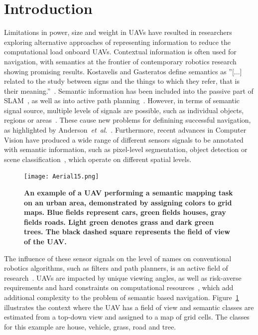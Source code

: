 \documentclass[twocolumn,letterpaper]{IEEEAerospaceCLS}  %
\newcommand{\abbreviation}[1]{\emph{#1}.}
\newcommand{\etal}{\abbreviation{et~al}}
\begin{document}
\section{Introduction} \label{sec:Intro}
Limitations in power, size and weight in UAVs have resulted in researchers exploring alternative approaches of representing information to reduce the computational load onboard UAVs. Contextual information is often used for navigation, with semantics at the frontier of contemporary robotics research showing promising results. Kostavelis and Gasteratos define semantics as ''[...] related to the study between signs and the things to which they refer, that is their meaning.''~\cite{kostavelis_semantic_2015}. Semantic information has been included into the passive part of SLAM~\cite{cadena_past_2016,zhang_hierarchical_2019}, as well as into active path planning~\cite{koch_automatic_2019,alirezaie_exploiting_2017}.  However, in terms of semantic signal source, multiple levels of signals are possible, such as individual objects, regions or areas~\cite{kostavelis_semantic_2015}. These cause new problems for definining successful navigation, as highlighted by Anderson~\etal~\cite{anderson_evaluation_2018}. Furthermore, recent advances in Computer Vision have produced a wide range of different sensors signals to be annotated with semantic information, such as pixel-level segmentation, object detection or scene classification~\cite{alom_history_2018}, which operate on different spatial levels.
\begin{figure}[t]
    \centering
    \texttt{[image: Aerial15.png]}\\
    \caption{\bf{An example of a UAV performing a semantic mapping task on an urban area, demonstrated by assigning colors to grid maps. Blue fields represent cars, green fields houses, gray fields roads. Light green denotes grass and dark green trees. The black dashed square represents the field of view of the UAV.}}
    \label{fig:AerialImg}
\end{figure}
The influence of these sensor signals on the level of names on conventional robotics algorithms, such as filters and path planners, is an active field of research~\cite{kostavelis_semantic_2015,cadena_past_2016,anderson_evaluation_2018}. UAVs are impacted by unique viewing angles, as well as risk-averse requirements and hard constraints on computational resources~\cite{mandel_method_2020,gonzalez_unmanned_2016,boroujerdian_mavbench_2018}, which add additional complexity to the problem of semantic based navigation. Figure~\ref{fig:AerialImg} illustrates the context where the UAV has a field of view and semantic classes are estimated from a top-down view and assigned to a map of grid cells. The classes for this example are house, vehicle, grass, road and tree.  
\end{document}
